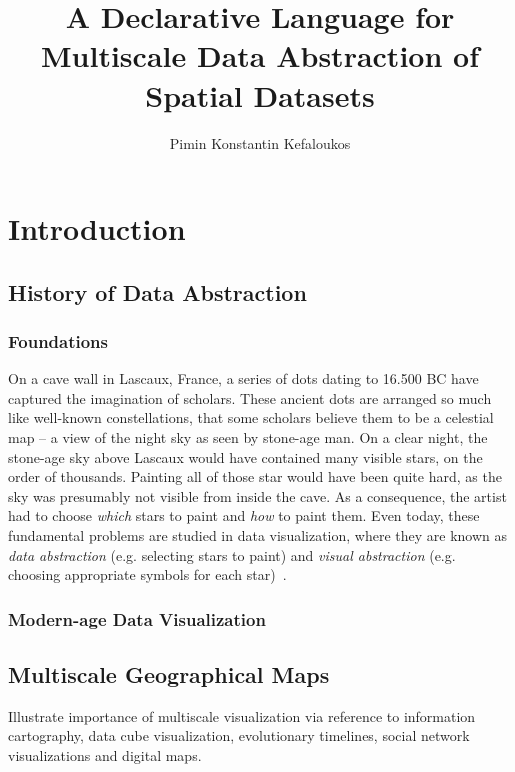 \documentclass[11pt, oneside]{report}   	%
\title{A Declarative Language for Multiscale Data Abstraction of Spatial Datasets}
\author{Pimin Konstantin Kefaloukos}
\begin{document}
\maketitle

\tableofcontents

\part{Introduction}

\chapter{History of Data Abstraction}

\section{Foundations}
On a cave wall in Lascaux, France, a series of dots dating to 16.500 BC have captured the imagination of scholars. These ancient dots are arranged so much like well-known constellations, that some scholars believe them to be a celestial map -- a view of the night sky as seen by stone-age man. On a clear night, the stone-age sky above Lascaux would have contained many visible stars, on the order of thousands. Painting all of those star would have been quite hard, as the sky was presumably not visible from inside the cave. As a consequence, the artist had to choose \emph{which} stars to paint and \emph{how} to paint them. Even today, these fundamental problems are studied in data visualization, where they are known as \emph{data abstraction} (e.g. selecting stars to paint) and \emph{visual abstraction} (e.g. choosing appropriate symbols for each star)~\cite{stolte2003multiscale}.


\section{Modern-age Data Visualization}

\chapter{Multiscale Geographical Maps}
Illustrate importance of multiscale visualization via reference to information cartography, data cube visualization, evolutionary timelines, social network visualizations and digital maps.
\end{document}
